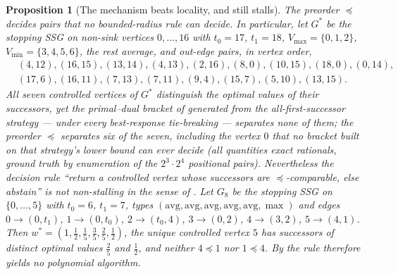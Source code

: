 \documentclass[11pt]{article}
\theoremstyle{plain}
\newtheorem{proposition}[theorem]{Proposition}
\theoremstyle{definition}
\newcommand{\Vmax}{V_{\max}}
\newcommand{\Vmin}{V_{\min}}
\begin{document}
\begin{proposition}[The mechanism beats locality, and still stalls]\label{prop:simorder-stalls}
The preorder $\preceq$ decides pairs that no bounded-radius rule can
decide. In particular, let $G^{\ast}$ be the stopping SSG on non-sink
vertices $0,\dots,16$ with $t_0=17$, $t_1=18$,
$\Vmax=\{0,1,2\}$, $\Vmin=\{3,4,5,6\}$, the rest average, and out-edge
pairs, in vertex order,
\[
\begin{aligned}
&(4,12),(16,15),(13,14),(4,13),(2,16),(8,0),(10,15),(18,0),(0,14),\\
&(17,6),(16,11),(7,13),(7,11),(9,4),(15,7),(5,10),(13,15).
\end{aligned}
\]
All seven controlled vertices of $G^{\ast}$ distinguish the optimal
values of their successors, yet the primal--dual bracket of
 generated from the all-first-successor strategy ---
under every best-response tie-breaking --- separates none of them; the
preorder $\preceq$ separates six of the seven, including the vertex $0$
that no bracket built on that strategy's lower bound can ever decide
(all quantities exact rationals, ground truth by enumeration of the
$2^{3}\cdot2^{4}$ positional pairs). Nevertheless the decision rule ``return a
controlled vertex whose successors are $\preceq$-comparable, else
abstain'' is not non-stalling in the sense of
. Let $G_8$ be the stopping SSG on
$\{0,\dots,5\}$ with $t_0=6$, $t_1=7$, types
$(\mathrm{avg},\mathrm{avg},\mathrm{avg},\mathrm{avg},\mathrm{avg},\max)$
and edges
$0\to(0,t_1)$, $1\to(0,t_0)$, $2\to(t_0,4)$, $3\to(0,2)$, $4\to(3,2)$,
$5\to(4,1)$. Then
$w^\ast=(1,\tfrac12,\tfrac15,\tfrac35,\tfrac25,\tfrac12)$, the unique
controlled vertex $5$ has successors of \emph{distinct} optimal values
$\tfrac25$ and $\tfrac12$, and neither $4\preceq1$ nor $1\preceq4$. By
 the rule therefore yields no polynomial
algorithm.
\end{proposition}
\end{document}
